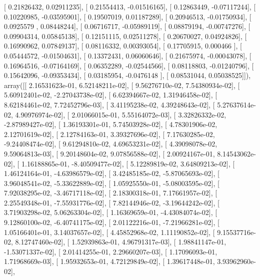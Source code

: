\documentclass{article}
\begin{document}
       [ 0.21826432,  0.02911235],
       [ 0.21554413, -0.01516165],
       [ 0.12863449, -0.07117244],
       [ 0.10220985, -0.03595901],
       [ 0.19507019,  0.01187289],
       [ 0.20946513, -0.01750934],
       [ 0.0925579 ,  0.08448244],
       [ 0.06716717, -0.05989119],
       [ 0.08879194, -0.00747276],
       [ 0.09904314,  0.05845138],
       [ 0.12151115,  0.02511278],
       [ 0.20670027,  0.04924826],
       [ 0.16990962,  0.07849137],
       [ 0.08116332,  0.00393054],
       [ 0.17705915,  0.000466  ],
       [ 0.05444572, -0.01504631],
       [ 0.13372431,  0.06060646],
       [ 0.21675974, -0.00043078],
       [ 0.16964516, -0.07164169],
       [ 0.06352289, -0.02544566],
       [ 0.08118803, -0.01240796],
       [ 0.15642096, -0.09353434],
       [ 0.03185954, -0.0476148 ],
       [ 0.08531044,  0.05038525]]), array([[  2.16531623e-01,   6.52148211e-02],
       [  9.56276710e-02,   7.54380934e-02],
       [  5.60912401e-02,  -2.27043738e-02],
       [  6.62394667e-02,   1.31946458e-02],
       [  8.62184461e-02,   7.72452796e-03],
       [  3.41195238e-02,   4.39248643e-02],
       [  5.27637614e-02,   4.90976974e-02],
       [  2.01066015e-01,   5.55164072e-03],
       [  3.32826332e-02,  -2.87989427e-02],
       [  1.36193301e-01,   5.74503928e-02],
       [  4.78301906e-02,   2.12701619e-02],
       [  2.12784163e-01,   3.39327696e-02],
       [  7.17630285e-02,  -9.24408474e-02],
       [  9.61294810e-02,   4.69653231e-02],
       [  4.39098078e-02,   9.59064813e-03],
       [  9.20148604e-02,   9.07856588e-02],
       [  2.00924167e-01,   8.14543062e-02],
       [  1.16188865e-01,  -8.40509477e-02],
       [  5.12289819e-02,   3.64809213e-02],
       [  1.46124164e-01,  -4.63986579e-02],
       [  3.42485185e-02,  -5.87065693e-02],
       [  3.96048541e-02,  -5.33622889e-02],
       [  1.05925550e-01,  -5.08003595e-02],
       [  7.92038295e-02,  -3.46717118e-02],
       [  2.18300318e-01,   7.17661957e-02],
       [  2.25549348e-01,  -7.55931776e-02],
       [  7.82144946e-02,  -3.19644242e-02],
       [  3.71903298e-02,   5.06263304e-02],
       [  1.16369659e-01,  -4.43084074e-02],
       [  9.12860100e-02,  -6.40741175e-02],
       [  2.01122216e-01,  -7.21966281e-02],
       [  1.05166401e-01,   3.14037657e-02],
       [  4.45852968e-02,   1.11190852e-02],
       [  9.15537716e-02,   8.12747460e-02],
       [  1.52939863e-01,   4.96791317e-03],
       [  1.98841147e-01,  -1.53071337e-02],
       [  2.01414255e-01,   2.29660207e-03],
       [  1.17096093e-01,   1.71968669e-03],
       [  1.95932653e-01,   4.72129849e-02],
       [  1.39617448e-01,   3.93962960e-02],
\end{document}
